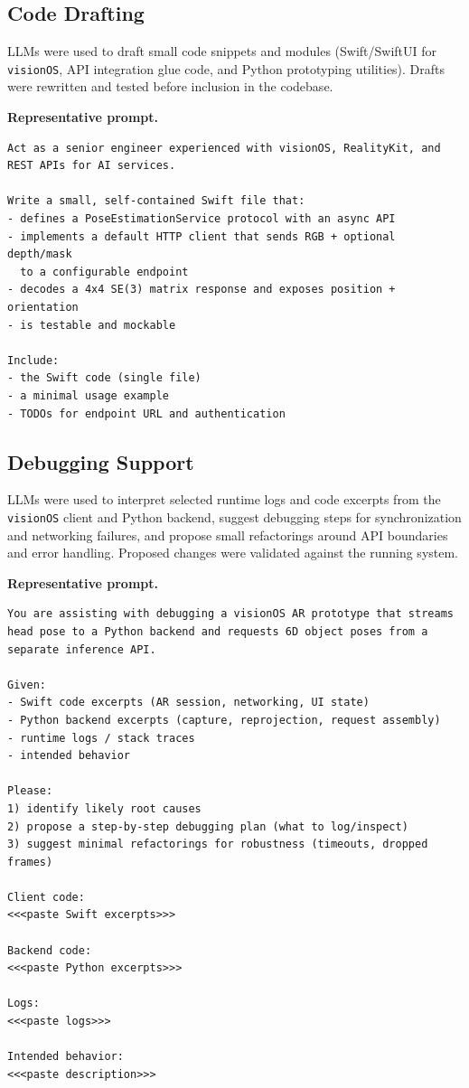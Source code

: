 \subsection{Code Drafting}
\label{appendix:ai-codegen}

LLMs were used to draft small code snippets and modules (Swift/SwiftUI for \texttt{visionOS}, API integration glue code, and Python prototyping utilities). Drafts were rewritten and tested before inclusion in the codebase.

\textbf{Representative prompt.}
\begin{verbatim}
Act as a senior engineer experienced with visionOS, RealityKit, and
REST APIs for AI services.

Write a small, self-contained Swift file that:
- defines a PoseEstimationService protocol with an async API
- implements a default HTTP client that sends RGB + optional depth/mask
  to a configurable endpoint
- decodes a 4x4 SE(3) matrix response and exposes position + orientation
- is testable and mockable

Include:
- the Swift code (single file)
- a minimal usage example
- TODOs for endpoint URL and authentication
\end{verbatim}

\subsection{Debugging Support}
\label{appendix:ai-debugging}

LLMs were used to interpret selected runtime logs and code excerpts from the \texttt{visionOS} client and Python backend, suggest debugging steps for synchronization and networking failures, and propose small refactorings around API boundaries and error handling. Proposed changes were validated against the running system.

\textbf{Representative prompt.}
\begin{verbatim}
You are assisting with debugging a visionOS AR prototype that streams
head pose to a Python backend and requests 6D object poses from a
separate inference API.

Given:
- Swift code excerpts (AR session, networking, UI state)
- Python backend excerpts (capture, reprojection, request assembly)
- runtime logs / stack traces
- intended behavior

Please:
1) identify likely root causes
2) propose a step-by-step debugging plan (what to log/inspect)
3) suggest minimal refactorings for robustness (timeouts, dropped frames)

Client code:
<<<paste Swift excerpts>>>

Backend code:
<<<paste Python excerpts>>>

Logs:
<<<paste logs>>>

Intended behavior:
<<<paste description>>>
\end{verbatim}

